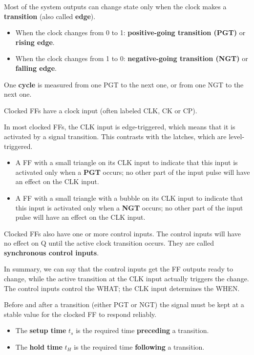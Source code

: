     \par Most of the system outputs can change state only when the clock makes
    a \textbf{transition} (also called \textbf{edge}).
    \begin{itemize}
      \item When the clock changes from 0 to 1: \textbf{positive-going
        transition (PGT)} or \textbf{rising edge}.
      \item When the clock changes from 1 to 0: \textbf{negative-going
        transition (NGT)} or \textbf{falling edge}.
    \end{itemize}
    \par One \textbf{cycle} is measured from one PGT to the next one, or from
    one NGT to the next one.

    \par Clocked FFs have a clock input (often labeled CLK, CK or CP).
    \par In most clocked FFs, the CLK input is edge-triggered, which means
    that it is activated by a signal transition.
    This contrasts with the latches, which are level-triggered.
    \begin{itemize}
      \item A FF with a small triangle on its CLK input to indicate
        that this input is activated only when a \textbf{PGT} occurs;
        no other part of the input pulse will have an effect
        on the CLK input.
      \item A FF with a small triangle with a bubble on its CLK input to indicate
        that this input is activated only when a \textbf{NGT}
       occurs; no other part of the input pulse will have an effect
      on the CLK input.
    \end{itemize}
    \par Clocked FFs also have one or more control inputs. The control
    inputs will have no effect on Q until the active clock transition occurs.
    They are called \textbf{synchronous control inputs}.
    \par In summary, we can say that the control inputs get the FF outputs ready
    to change, while the active transition at the CLK input actually triggers
    the change. The control inputs control the WHAT; the CLK input determines the WHEN.

    \par Before and after a transition (either PGT or NGT) the signal
    must be kept at a stable value for the clocked FF to respond reliably.
    \begin{itemize}
      \item The \textbf{setup time} $t_{s}$ is the required time
        \textbf{preceding} a transition.
      \item The \textbf{hold time} $t_{H}$ is the required time
        \textbf{following} a transition.
    \end{itemize}

